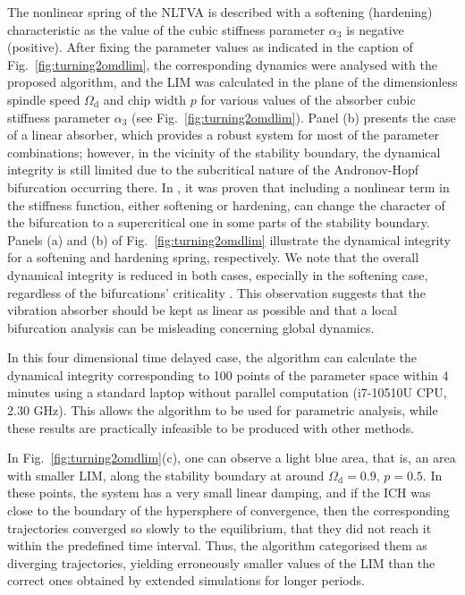 \documentclass[preprint,12pt]{elsarticle}
\begin{document}
	The nonlinear spring of the NLTVA is described with a softening (hardening) characteristic as the value of the cubic stiffness parameter $\alpha_3$ is negative (positive). After fixing the parameter values as indicated in the caption of Fig.~\ref{fig:turning2omdlim}, the corresponding dynamics were analysed with the proposed algorithm, and the LIM was calculated in the plane of the dimensionless spindle speed $\Omega_\mathrm{d}$ and chip width $p$ for various values of the absorber cubic stiffness parameter $\alpha_3$ (see Fig.~\ref{fig:turning2omdlim}). Panel (b) presents the case of a linear absorber, which provides a robust system for most of the parameter combinations; however, in the vicinity of the stability boundary, the dynamical integrity is still limited due to the subcritical nature of the Andronov-Hopf bifurcation occurring there.
	In \cite{habib2017chatter}, it was proven that including a nonlinear term in the stiffness function, either softening or hardening, can change the character of the bifurcation to a supercritical one in some parts of the stability boundary.
	Panels (a) and (b) of Fig.~\ref{fig:turning2omdlim} illustrate the dynamical integrity for a softening and hardening spring, respectively.
	We note that the overall dynamical integrity is reduced in both cases, especially in the softening case, regardless of the bifurcations' criticality \cite{habib2017chatter}. 
	This observation suggests that the vibration absorber should be kept as linear as possible and that a local bifurcation analysis can be misleading concerning global dynamics. 
	
	In this four dimensional time delayed case, the algorithm can calculate the dynamical integrity  corresponding to 100 points of the parameter space within 4 minutes using a standard laptop without parallel computation (i7-10510U CPU, 2.30 GHz). This allows the algorithm to be used for parametric analysis, while these results are practically infeasible to be produced with other methods. 
	
	In Fig.~\ref{fig:turning2omdlim}(c), one can observe a light blue area, that is, an area with smaller LIM, along the stability boundary at around $\Omega_\mathrm{d}=0.9$, $p=0.5$. In these points, the system has a very small linear damping, and if the ICH was close to the boundary of the hypersphere of convergence, then the corresponding trajectories converged so slowly to the equilibrium, that they did not reach it within the predefined time interval. Thus, the algorithm categorised them as diverging trajectories, yielding erroneously smaller values of the LIM than the correct ones obtained by extended simulations for longer periods. 
	
\end{document}
